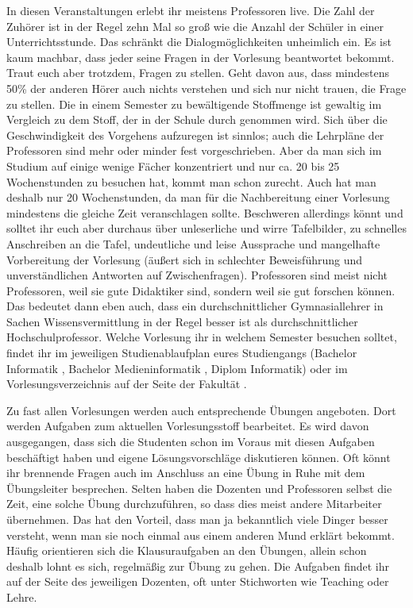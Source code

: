 In diesen Veranstaltungen erlebt ihr meistens Professoren live.
Die Zahl der Zuhörer ist in der Regel zehn Mal so groß wie die Anzahl der Schüler in einer Unterrichtsstunde.
Das schränkt die Dialogmöglichkeiten unheimlich ein.
Es ist kaum machbar, dass jeder seine Fragen in der Vorlesung beantwortet bekommt.
Traut euch aber trotzdem, Fragen zu stellen.
Geht davon aus, dass mindestens 50\% der anderen Hörer auch nichts verstehen und sich nur nicht trauen, die Frage zu stellen.
Die in einem Semester zu bewältigende Stoffmenge ist gewaltig im Vergleich zu dem Stoff, der in der Schule durch genommen wird.
Sich über die Geschwindigkeit des Vorgehens aufzuregen ist sinnlos; auch die Lehrpläne der Professoren sind mehr oder minder fest vorgeschrieben.
Aber da man sich im Studium auf einige wenige Fächer konzentriert und nur ca. 20 bis 25 Wochenstunden zu besuchen hat, kommt man schon zurecht.
Auch hat man deshalb nur 20 Wochenstunden, da man für die Nachbereitung einer Vorlesung mindestens die gleiche Zeit veranschlagen sollte.
Beschweren allerdings könnt und solltet ihr euch aber durchaus über unleserliche und wirre Tafelbilder, zu schnelles Anschreiben an die Tafel, undeutliche und leise Aussprache und mangelhafte Vorbereitung der Vorlesung (äußert sich in schlechter Beweisführung und unverständlichen Antworten auf Zwischenfragen).
Professoren sind meist nicht Professoren, weil sie gute Didaktiker sind, sondern weil sie gut forschen können.
Das bedeutet dann eben auch, dass ein durchschnittlicher Gymnasiallehrer in Sachen Wissensvermittlung in der Regel besser ist als durchschnittlicher Hochschulprofessor.
Welche Vorlesung ihr in welchem Semester besuchen solltet, findet ihr im jeweiligen Studienablaufplan eures Studiengangs (Bachelor Informatik \link, Bachelor Medieninformatik \link, Diplom Informatik\link) oder im Vorlesungsverzeichnis auf der Seite der Fakultät \link.


Zu fast allen Vorlesungen werden auch entsprechende Übungen angeboten.
Dort werden Aufgaben zum aktuellen Vorlesungsstoff bearbeitet.
Es wird davon ausgegangen, dass sich die Studenten schon im Voraus mit diesen Aufgaben beschäftigt haben und eigene Lösungsvorschläge diskutieren können.
Oft könnt ihr brennende Fragen auch im Anschluss an eine Übung in Ruhe mit dem Übungsleiter besprechen.
Selten haben die Dozenten und Professoren selbst die Zeit, eine solche Übung durchzuführen, so dass dies meist andere Mitarbeiter übernehmen.
Das hat den Vorteil, dass man ja bekanntlich viele Dinger besser versteht, wenn man sie noch einmal aus einem anderen Mund erklärt bekommt.
Häufig orientieren sich die Klausuraufgaben an den Übungen, allein schon deshalb lohnt es sich, regelmäßig zur Übung zu gehen.
Die Aufgaben findet ihr auf der Seite des jeweiligen Dozenten, oft unter Stichworten wie Teaching oder Lehre.

